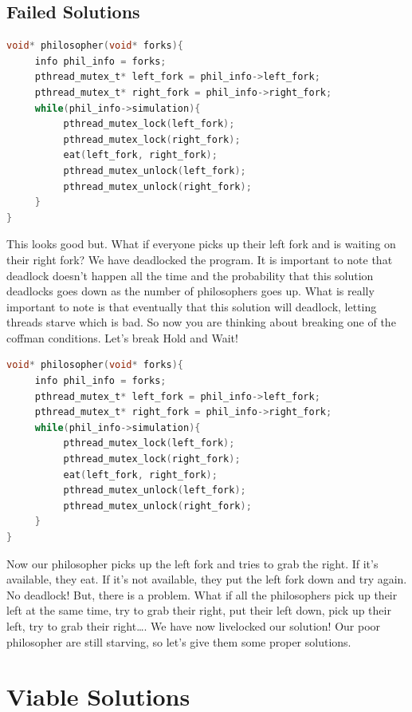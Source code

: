 \subsection{Failed Solutions}

\begin{lstlisting}[language=C]
void* philosopher(void* forks){
     info phil_info = forks;
     pthread_mutex_t* left_fork = phil_info->left_fork;
     pthread_mutex_t* right_fork = phil_info->right_fork;
     while(phil_info->simulation){
          pthread_mutex_lock(left_fork);
          pthread_mutex_lock(right_fork);
          eat(left_fork, right_fork);
          pthread_mutex_unlock(left_fork);
          pthread_mutex_unlock(right_fork);
     }
}
\end{lstlisting}

This looks good but. What if everyone picks up their left fork and is waiting on their right fork? We have deadlocked the program. It is important to note that deadlock doesn't happen all the time and the probability that this solution deadlocks goes down as the number of philosophers goes up. What is really important to note is that eventually that this solution will deadlock, letting threads starve which is bad. So now you are thinking about breaking one of the coffman conditions. Let's break Hold and Wait!

\begin{lstlisting}[language=C]
void* philosopher(void* forks){
     info phil_info = forks;
     pthread_mutex_t* left_fork = phil_info->left_fork;
     pthread_mutex_t* right_fork = phil_info->right_fork;
     while(phil_info->simulation){
          pthread_mutex_lock(left_fork);
          pthread_mutex_lock(right_fork);
          eat(left_fork, right_fork);
          pthread_mutex_unlock(left_fork);
          pthread_mutex_unlock(right_fork);
     }
}
\end{lstlisting}

Now our philosopher picks up the left fork and tries to grab the right. If it's available, they eat. If it's not available, they put the left fork down and try again. No deadlock! But, there is a problem. What if all the philosophers pick up their left at the same time, try to grab their right, put their left down, pick up their left, try to grab their right\ldots{}. We have now livelocked our solution! Our poor philosopher are still starving, so let's give them some proper solutions.

\section{Viable Solutions}

